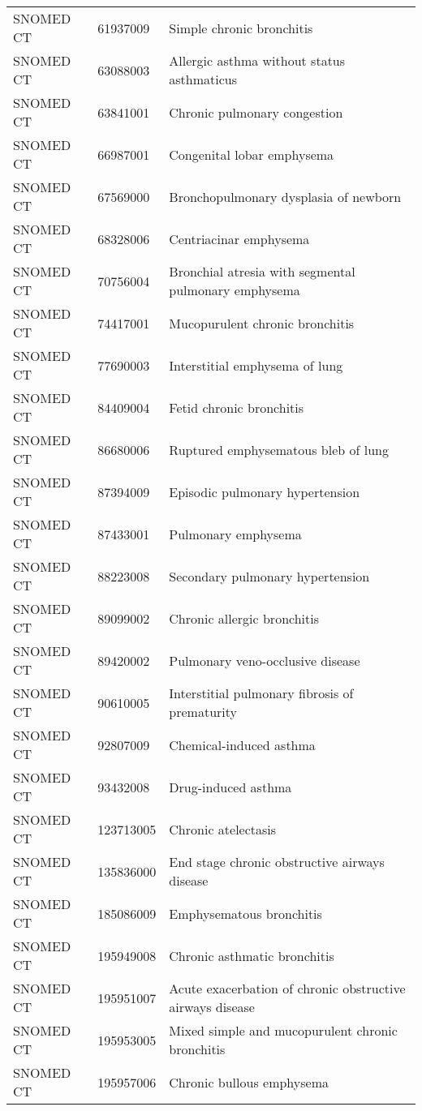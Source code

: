 \begin{table}[ht]
\begin{tabular}{lll}
  SNOMED CT & 61937009 & Simple chronic bronchitis \\ 
  SNOMED CT & 63088003 & Allergic asthma without status asthmaticus \\ 
  SNOMED CT & 63841001 & Chronic pulmonary congestion \\ 
  SNOMED CT & 66987001 & Congenital lobar emphysema \\ 
  SNOMED CT & 67569000 & Bronchopulmonary dysplasia of newborn \\ 
  SNOMED CT & 68328006 & Centriacinar emphysema \\ 
  SNOMED CT & 70756004 & Bronchial atresia with segmental pulmonary emphysema \\ 
  SNOMED CT & 74417001 & Mucopurulent chronic bronchitis \\ 
  SNOMED CT & 77690003 & Interstitial emphysema of lung \\ 
  SNOMED CT & 84409004 & Fetid chronic bronchitis \\ 
  SNOMED CT & 86680006 & Ruptured emphysematous bleb of lung \\ 
  SNOMED CT & 87394009 & Episodic pulmonary hypertension \\ 
  SNOMED CT & 87433001 & Pulmonary emphysema \\ 
  SNOMED CT & 88223008 & Secondary pulmonary hypertension \\ 
  SNOMED CT & 89099002 & Chronic allergic bronchitis \\ 
  SNOMED CT & 89420002 & Pulmonary veno-occlusive disease \\ 
  SNOMED CT & 90610005 & Interstitial pulmonary fibrosis of prematurity \\ 
  SNOMED CT & 92807009 & Chemical-induced asthma \\ 
  SNOMED CT & 93432008 & Drug-induced asthma \\ 
  SNOMED CT & 123713005 & Chronic atelectasis \\ 
  SNOMED CT & 135836000 & End stage chronic obstructive airways disease \\ 
  SNOMED CT & 185086009 & Emphysematous bronchitis \\ 
  SNOMED CT & 195949008 & Chronic asthmatic bronchitis \\ 
  SNOMED CT & 195951007 & Acute exacerbation of chronic obstructive airways disease \\ 
  SNOMED CT & 195953005 & Mixed simple and mucopurulent chronic bronchitis \\ 
  SNOMED CT & 195957006 & Chronic bullous emphysema \\ 

\end{tabular}
\end{table}
